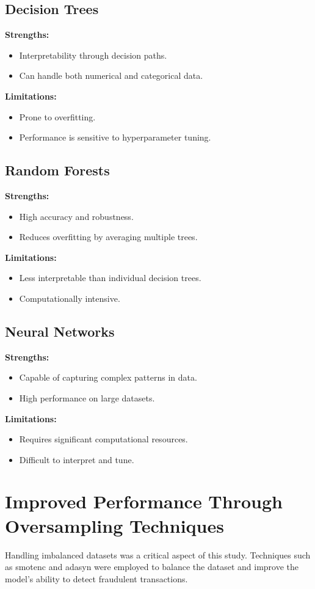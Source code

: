\documentclass[12pt,a4paper]{report}
\begin{document}
\subsection{Decision Trees}
\textbf{Strengths:}
\begin{itemize}
    \item Interpretability through decision paths.
    \item Can handle both numerical and categorical data.
\end{itemize}
\textbf{Limitations:}
\begin{itemize}
    \item Prone to overfitting.
    \item Performance is sensitive to hyperparameter tuning.
\end{itemize}

\subsection{Random Forests}
\textbf{Strengths:}
\begin{itemize}
    \item High accuracy and robustness.
    \item Reduces overfitting by averaging multiple trees.
\end{itemize}
\textbf{Limitations:}
\begin{itemize}
    \item Less interpretable than individual decision trees.
    \item Computationally intensive.
\end{itemize}

\subsection{Neural Networks}
\textbf{Strengths:}
\begin{itemize}
    \item Capable of capturing complex patterns in data.
    \item High performance on large datasets.
\end{itemize}
\textbf{Limitations:}
\begin{itemize}
    \item Requires significant computational resources.
    \item Difficult to interpret and tune.
\end{itemize}


\section{Improved Performance Through Oversampling Techniques}
Handling imbalanced datasets was a critical aspect of this study. Techniques such as \acrshort{smotenc} and \acrshort{adasyn} were employed to balance the dataset and improve the model's ability to detect fraudulent transactions.
\end{document}
